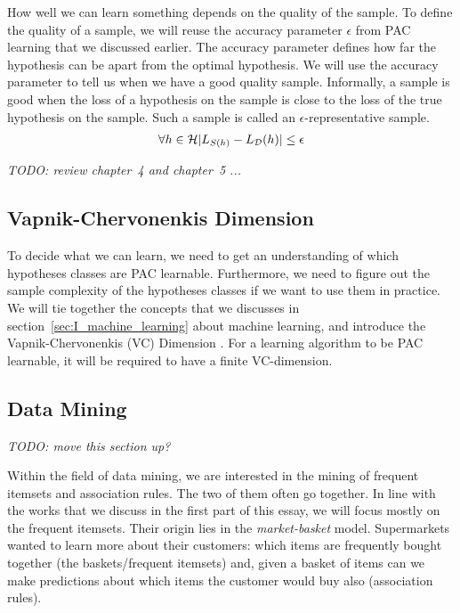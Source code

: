 \documentclass[../main.tex]{subfiles}
\begin{document}
How well we can learn something depends on the quality of the sample.
To define the quality of a sample, we will reuse the accuracy parameter $\epsilon$ from PAC learning that we discussed earlier.
The accuracy parameter defines how far the hypothesis can be apart from the optimal hypothesis.
We will use the accuracy parameter to tell us when we have a good quality sample.
Informally, a sample is good when the loss of a hypothesis on the sample is close to the loss of the true hypothesis on the sample.
Such a sample is called an $\epsilon$-representative sample.
\begin{align}
    \label{eq:rep_sample}
    \forall h \in \mathcal{H} \lvert L_{S(h)} - L_{\mathcal{D}}(h)\rvert \le \epsilon
\end{align}
\cite[Chapter~4]{Shalev2014understanding}

\emph{\color{red}TODO: review chapter~4 and chapter~5 ...}

\subsection{Vapnik-Chervonenkis Dimension}
\label{sec:I_vc_dimension}

To decide what we can learn, we need to get an understanding of which hypotheses classes are PAC learnable.
Furthermore, we need to figure out the sample complexity of the hypotheses classes if we want to use them in practice.
We will tie together the concepts that we discusses in section~\ref{sec:I_machine_learning} about machine learning,
and introduce the Vapnik-Chervonenkis (VC) Dimension \cite{Vapnik2015}.
For a learning algorithm to be PAC learnable, it will be required to have a finite VC-dimension.
\cite[Chapter~6]{Shalev2014understanding}

\subsection{Data Mining}
\label{sec:I_data_mining}

\emph{\color{red}TODO: move this section up?}

Within the field of data mining, we are interested in the mining of frequent itemsets and association rules.
The two of them often go together.
In line with the works that we discuss in the first part of this essay, we will focus mostly on the frequent itemsets.
Their origin lies in the \emph{market-basket} model.
Supermarkets wanted to learn more about their customers:
which items are frequently bought together (the baskets/frequent itemsets)
and, given a basket of items can we make predictions about which items the customer would buy also (association rules).
\cite[Chapter~6]{Leskovec2014mining}
\end{document}
